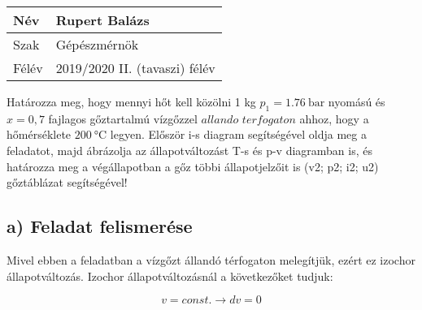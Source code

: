 
\usetikzlibrary{arrows.meta}
\usetikzlibrary{patterns}


\newcommand\pegy{0.176} %
\newcommand\TegyK{389.34} %
\newcommand\TegyC{116.19} %
\newcommand\vegy{0.699}
\newcommand\uegy{1913.2}
\newcommand\hegy{2036.3}
\newcommand\segy{5.4645}
\newcommand\xegy{0.7}
\newcommand\pvesszo{0.2575}
\newcommand\TvesszoK{401.52}
\newcommand\TvesszoC{128.37}
\newcommand\vvesszo{0.699}
\newcommand\uvesszo{2537.3}
\newcommand\hvesszo{2717.3}
\newcommand\svesszo{7.0419}
\newcommand\xvesszo{1}
\newcommand\pketto{0.3073}
\newcommand\TkettoK{473.15}
\newcommand\TkettoC{200}
\newcommand\vketto{0.699}
\newcommand\uketto{2649.5}
\newcommand\hketto{2864.3}
\newcommand\sketto{7.2992}

\newcommand\pontvastagsag{0.7 mm} %

\begin{tabular}{ | p{2cm} | p{14cm} | } 
	\hline
	Név & Rupert Balázs \\ 
	\hline
	Szak & Gépészmérnök\\ 
	\hline
	Félév & 2019/2020 II. (tavaszi) félév \\ 
	\hline
\end{tabular}
\vspace{0.5cm}

	Határozza meg, hogy mennyi hőt kell közölni 1 kg $p_1=\SI{1,76}{\bar}$ nyomású és $x = 0,7$ fajlagos gőztartalmú vízgőzzel $allando$ $terfogaton$ ahhoz, hogy a hőmérséklete $\SI{200}{\celsius}$ legyen. Először i-s diagram segítségével oldja meg a feladatot, majd ábrázolja az állapotváltozást T-s és p-v diagramban is, és határozza meg a végállapotban a gőz többi állapotjelzőit is (v2; p2; i2; u2) gőztáblázat segítségével!
	\vspace{2mm}

\subsection*{a) Feladat felismerése}
	Mivel ebben a feladatban a vízgőzt állandó térfogaton melegítjük, ezért ez izochor állapotváltozás.
	Izochor állapotváltozásnál a következőket tudjuk:
	
\begin{equation}
	v=const. \rightarrow dv=0
\end{equation}

